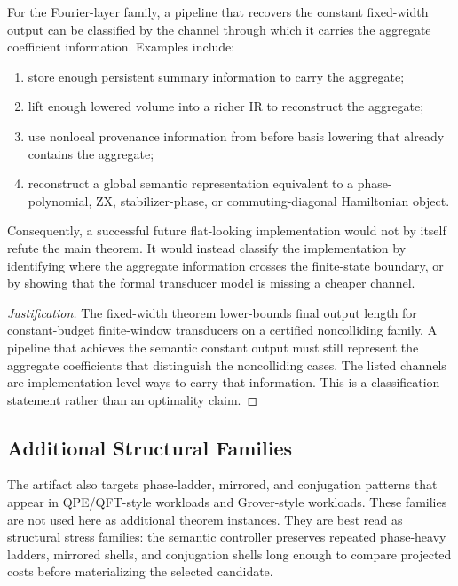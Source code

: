 \begin{proposition}
\label{prop:classification-boundary}
For the Fourier-layer family, a pipeline that recovers the constant
fixed-width output can be classified by the channel through which it carries
the aggregate coefficient information. Examples include:
\begin{enumerate}[leftmargin=1.5em]
    \item store enough persistent summary information to carry the aggregate;
    \item lift enough lowered volume into a richer IR to reconstruct the
    aggregate;
    \item use nonlocal provenance information from before basis lowering that
    already contains the aggregate;
    \item reconstruct a global semantic representation equivalent to a
    phase-polynomial, ZX, stabilizer-phase, or commuting-diagonal Hamiltonian
    object.
\end{enumerate}
Consequently, a successful future flat-looking implementation would not by
itself refute the main theorem. It would instead classify the implementation by
identifying where the aggregate information crosses the finite-state boundary,
or by showing that the formal transducer model is missing a cheaper channel.
\end{proposition}

\begin{proof}[Justification]
The fixed-width theorem lower-bounds final output length for constant-budget
finite-window transducers on a certified noncolliding family. A pipeline that
achieves the semantic constant output must still represent the aggregate
coefficients that distinguish the noncolliding cases. The listed channels are
implementation-level ways to carry that information. This is a classification
statement rather than an optimality claim.
\end{proof}

\subsection*{Additional Structural Families}

The artifact also targets phase-ladder, mirrored, and conjugation patterns that
appear in QPE/QFT-style workloads and Grover-style workloads. These families
are not used here as additional theorem instances. They are best read as
structural stress families: the semantic controller preserves repeated
phase-heavy ladders, mirrored shells, and conjugation shells long enough to
compare projected costs before materializing the selected candidate.

